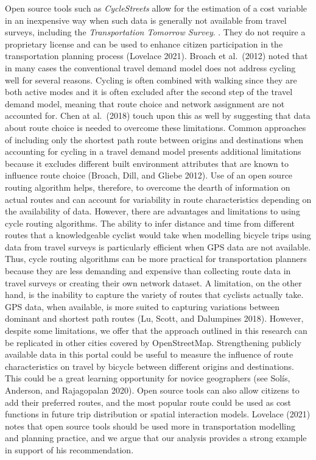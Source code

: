 \documentclass[smallextended]{svjour3}       %
\begin{document}
Open source tools such as \emph{CycleStreets} allow for the estimation
of a cost variable in an inexpensive way when such data is generally not
available from travel surveys, including the \emph{Transportation
Tomorrow Survey}. . They do not require a proprietary license and can be
used to enhance citizen participation in the transportation planning
process (Lovelace 2021). Broach et al.~(2012) noted that in many cases
the conventional travel demand model does not address cycling well for
several reasons. Cycling is often combined with walking since they are
both active modes and it is often excluded after the second step of the
travel demand model, meaning that route choice and network assignment
are not accounted for. Chen at al.~(2018) touch upon this as well by
suggesting that data about route choice is needed to overcome these
limitations. Common approaches of including only the shortest path route
between origins and destinations when accounting for cycling in a travel
demand model presents additional limitations because it excludes
different built environment attributes that are known to influence route
choice (Broach, Dill, and Gliebe 2012). Use of an open source routing
algorithm helps, therefore, to overcome the dearth of information on
actual routes and can account for variability in route characteristics
depending on the availability of data. However, there are advantages and
limitations to using cycle routing algorithms. The ability to infer
distance and time from different routes that a knowledgeable cyclist
would take when modelling bicycle trips using data from travel surveys
is particularly efficient when GPS data are not available. Thus, cycle
routing algorithms can be more practical for transportation planners
because they are less demanding and expensive than collecting route data
in travel surveys or creating their own network dataset. A limitation,
on the other hand, is the inability to capture the variety of routes
that cyclists actually take. GPS data, when available, is more suited to
capturing variations between dominant and shortest path routes (Lu,
Scott, and Dalumpines 2018). However, despite some limitations, we offer
that the approach outlined in this research can be replicated in other
cities covered by OpenStreetMap. Strengthening publicly available data
in this portal could be useful to measure the influence of route
characteristics on travel by bicycle between different origins and
destinations. This could be a great learning opportunity for novice
geographers (see Solís, Anderson, and Rajagopalan 2020). Open source
tools can also allow citizens to add their preferred routes, and the
most popular route could be used as cost functions in future trip
distribution or spatial interaction models. Lovelace (2021) notes that
open source tools should be used more in transportation modelling and
planning practice, and we argue that our analysis provides a strong
example in support of his recommendation.
\end{document}
